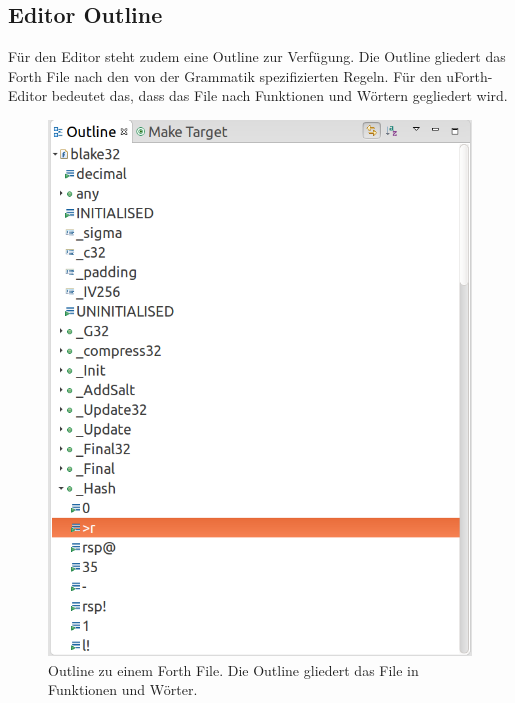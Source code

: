 \subsection{Editor Outline}
Für den Editor steht zudem eine Outline zur Verfügung. Die Outline gliedert das Forth File nach den von der Grammatik spezifizierten Regeln. Für den uForth-Editor bedeutet das, dass das File nach Funktionen und Wörtern gegliedert wird.

\begin{figure}[H]
	\centering
		\includegraphics[scale=0.3]{fortheditor/outline.png}
		\caption{Outline zu einem Forth File. Die Outline gliedert das File in Funktionen und Wörter.}
		\label{fig:outlineeditor}
\end{figure}

